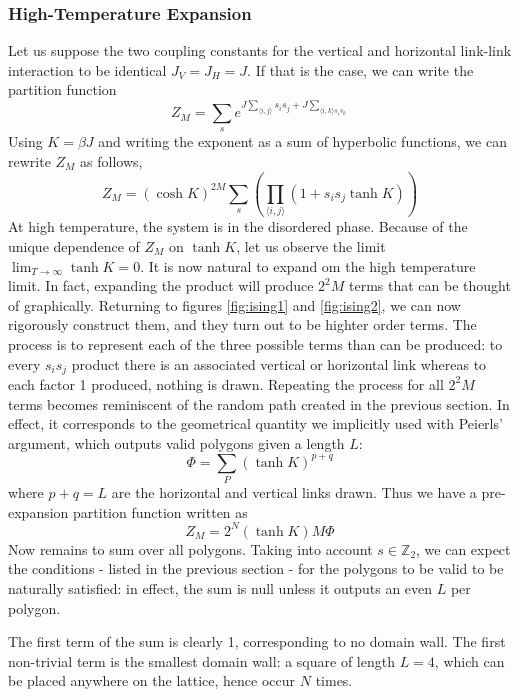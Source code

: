 \subsubsection{High-Temperature Expansion}
Let us suppose the two coupling constants for the vertical and horizontal link-link
interaction to be identical $J_V =J_H = J$. If that is the case, we can write
the partition function 
\begin{equation}
  Z_M = \sum_s e^{J\sum_{\langle i,j\rangle}s_is_j + J\sum_{\langle
  i,k\rangle s_i s_k}}
\end{equation}
Using $K=\beta J$ and writing the exponent as a sum of hyperbolic functions,
we can rewrite $Z_M$ as follows,
\begin{equation}
  Z_M = (\cosh K)^{2M}\sum_s\left(\prod_{\langle i,j\rangle}
  (1+s_is_j\tanh K)\right)
\end{equation}
At high temperature, the system is in the  disordered phase. Because of the
unique dependence of $Z_M$ on $\tanh K$, let us observe the limit
$\lim_{T\rightarrow\infty}\tanh K = 0$. It is now natural to expand om the high 
temperature limit. In fact, expanding the product will produce $2^2M$ terms
that can be thought of graphically. Returning to figures
\ref{fig:ising1} and \ref{fig:ising2}, we can now rigorously construct them, and they
turn out to be highter order terms. The process is to represent each of the
three possible terms than can be produced: to every $s_is_j$ product there is
an associated vertical or horizontal link whereas to each factor 1 produced,
nothing is drawn. Repeating the process for all $2^2 M$ terms becomes
reminiscent of the random path created in the previous  section. In effect, it
corresponds to the geometrical quantity we implicitly used with Peierls'
argument, which outputs valid polygons given a length $L$:
\begin{equation}
  \Phi = \sum_P(\tanh K)^{p+q}
\end{equation}
where $p+q = L$ are the horizontal and vertical links drawn. Thus we have a
pre-expansion partition function written as
\begin{equation}
  Z_M = 2^N(\tanh K)M\Phi
\end{equation}
Now remains to sum over all polygons. Taking into account $s\in \mathbb{Z}_2$,
we can expect the conditions - listed in the previous section - for the
polygons to be valid to be naturally satisfied: in effect, the sum is null
unless it outputs an even $L$ per polygon.
\par The first term of the sum is clearly 1, corresponding to no domain wall.
The first non-trivial term is the smallest domain wall: a square of length
$L=4$, which can be placed anywhere on the lattice, hence occur $N$ times.
